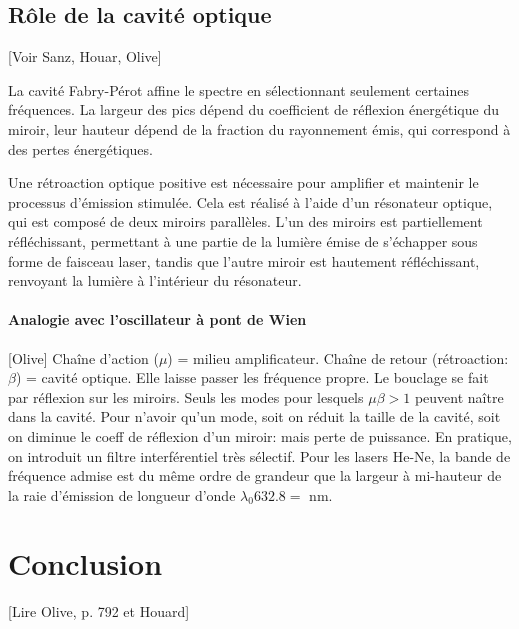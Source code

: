 \documentclass[11pt]{report}
\numberwithin{figure}{section}
\numberwithin{equation}{section}
\numberwithin{table}{section}
\newcommand{\1}{\boldsymbol{1}}
\begin{document}
\subsection{Rôle de la cavité optique}
 
[Voir Sanz, Houar, Olive]

La cavité Fabry-Pérot affine le spectre en sélectionnant seulement certaines fréquences. La largeur des pics dépend du coefficient de réflexion énergétique du miroir, leur hauteur dépend de la fraction du rayonnement émis, qui correspond à des pertes énergétiques.

Une rétroaction optique positive est nécessaire pour amplifier et maintenir le processus d'émission stimulée. Cela est réalisé à l'aide d'un résonateur optique, qui est composé de deux miroirs parallèles. L'un des miroirs est partiellement réfléchissant, permettant à une partie de la lumière émise de s'échapper sous forme de faisceau laser, tandis que l'autre miroir est hautement réfléchissant, renvoyant la lumière à l'intérieur du résonateur. 

\paragraph{Analogie avec l'oscillateur à pont de Wien} [Olive] Chaîne d'action ($\mu$) = milieu amplificateur. Chaîne de retour (rétroaction: $\beta$) = cavité optique. Elle laisse passer les fréquence propre. Le bouclage se fait par réflexion sur les miroirs. Seuls les modes pour lesquels $\mu \beta > 1$ peuvent naître dans la cavité. Pour n'avoir qu'un mode, soit on réduit la taille de la cavité, soit  on diminue le coeff de réflexion d'un miroir: mais perte de puissance. En pratique, on introduit un filtre interférentiel très sélectif. Pour les lasers He-Ne, la bande de fréquence admise est du même ordre de grandeur que la largeur à mi-hauteur de la raie d'émission de longueur d'onde $\lambda_0 632.8 =$ nm.
  
\section*{Conclusion}
  
[Lire Olive, p. 792 et Houard]
  
\end{document}
